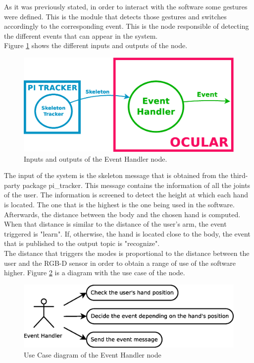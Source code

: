 	As it was previously stated, in order to interact with the software some gestures were defined. This is the module that detects those gestures and switches accordingly to the corresponding event. This is the node responsible of detecting the different events that can appear in the system. 
	\\
	Figure \ref{node_event} shows the different inputs and outputs of the node. 
		\begin{figure}[H]
			\begin{center}
			\includegraphics[width=0.5\linewidth]{img/diagrams/node_event.eps}
			\caption[Event Handler 3D node I/O]{Inputs and outputs of the Event Handler node.}		
			\label{node_event}
			\end{center}
		\end{figure}
	The input of the system is the skeleton message that is obtained from the third-party package pi\_tracker. This message contains the information of all the joints of the user. The information is screened to detect the height at which each hand is located. The one that is the highest is the one being used in the software. Afterwards, the distance between the body and the chosen hand is computed. When that distance is similar to the distance of the user's arm, the event triggered is "learn". If, otherwise, the hand is located close to the body, the event that is published to the output topic is "recognize". 
	\\

	The distance that triggers the modes is proportional to the distance between the user and the RGB-D sensor in order to obtain a range of use of the software higher. 
	Figure \ref{uc_event} is a diagram with the use case of the node. 
	\begin{figure}[H]
		\centering
			\includegraphics[scale=0.4]{img/diagrams/uc_event_handler.eps}
			\caption[Use case diagram Event Handler node]{Use Case diagram of the Event Handler node}
		\label{uc_event}
	\end{figure}

